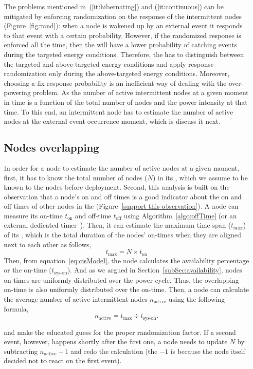 The problems mentioned in~(\ref{it:hibernating}) and (\ref{it:continuous}) can be mitigated by enforcing randomization on the response of the intermittent nodes (Figure~\ref{fig:rand}): when a node is wakened up by an external event it responds to that event with a certain probability. However, if the randomized response is enforced all the time, then the \sys will have a lower probability of catching events during the targeted energy conditions. Therefore, the \sys has to distinguish between the targeted and above-targeted energy conditions and apply response randomization only during the above-targeted energy conditions. Moreover, choosing a fix response probability is an inefficient way of dealing with the over-powering problem. As the number of active intermittent nodes at a given moment in time is a function of the total number of nodes and the power intensity at that time. To this end, an intermittent node has to estimate the number of active nodes at the external event occurrence moment, which is discuss it next.

\subsection{Nodes overlapping}
In order for a node to estimate the number of active nodes at a given moment, first, it has to know the total number of nodes ($N$) in its \sys, which we assume to be known to the nodes before deployment. Second, this analysis is built on the observation that a node's on and off times is a good indicator about the on and off times of other nodes in the \sys (Figure~\ref{support this observation}). A node can measure its on-time $t_\text{on}$ and off-time $t_\text{off}$ using  Algorithm~\ref{algo:offTime} (or an external dedicated timer~\cite{hester2017timely}). Then, it can estimate the maximum time span ($t_{max}$) of its \sys, which is the total duration of the nodes' on-times when they are aligned next to each other as follows,
$$
t_\text{max} = N\times t_\text{on}
$$
Then, from equation~\ref{eq:cisModel}, the node calculates the \sys availability percentage or the \sys on-time ($t_\text{sys-on}$). And as we argued in Section~\ref{subSec:availability}, nodes on-times are uniformly distributed over the \sys power cycle. Thus, the overlapping on-time is also uniformly distributed over the \sys on-time. Then, a node can calculate the average number of active intermittent nodes $n_\text{active}$ using the following formula,
$$
n_\text{active} = t_\text{max} \div t_\text{sys-on}.
$$

and make the educated guess for the proper randomization factor. If a second event, however, happens shortly after the first one, a node needs to update $N$ by subtracting $n_\text{active}-1$ and redo the calculation (the $-1$ is because the node itself decided not to react on the first event). 